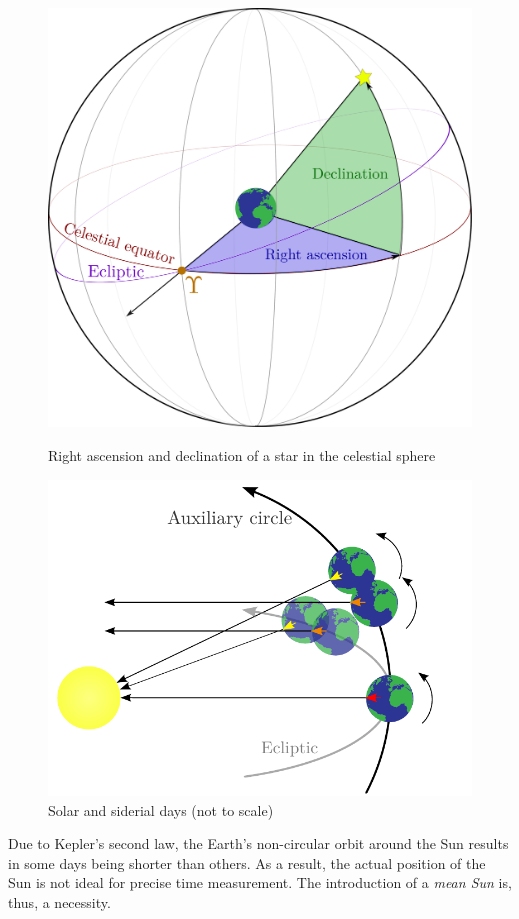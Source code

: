 \documentclass[../main.tex]{subfiles}
\begin{document}
\begin{figure}[htbp]
  \centering
  \begin{minipage}[ht]{0.48\textwidth}
    \centering
    \includegraphics[width=\textwidth]{Images/right_ascension-decli.pdf}
    \caption{Right ascension and declination of a star in the celestial sphere}
    \label{fig:right_ascesion}
  \end{minipage}
  \hfill
  \begin{minipage}[ht]{0.48\textwidth}
    \centering
    \includegraphics[width=\textwidth]{Images/siderial.pdf}
    \caption{Solar and siderial days (not to scale)}
    \label{fig:siderial}
  \end{minipage}
\end{figure}
Due to Kepler's second law, the Earth's non-circular orbit around the Sun results in some days being shorter than others. As a result, the actual position of the Sun is not ideal for precise time measurement. The introduction of a \emph{mean Sun} is, thus, a necessity.
\end{document}
